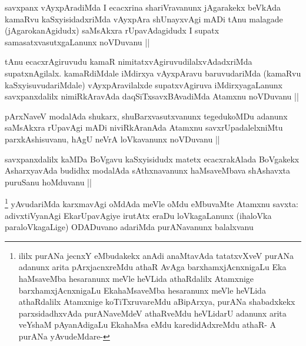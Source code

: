 \begin{artha}
savxpanx vAyxpAradiMda I ecacxrina shariVravanunx jAgarakekx beVkAda kamaRvu kaSxyisidadxriMda vAyxpAra shUnayxvAgi mADi tAnu malagade (jAgarokanAgidudx) saMsAkxra rUpavAdagidudx I supatx samasatxvasutxgaLanunx noVDuvanu ||
\end{artha}


\begin{artha}
tAnu ecacxrAgiruvudu kamaR nimitatxvAgiruvudilalxvAdadxriMda supatxnAgilalx. kamaRdiMdale iMdirxya vAyxpAravu baruvudariMda (kamaRvu kaSxyisuvudariMdale) vAyxpAravilalxde supatxvAgiruva iMdirxyagaLanunx savxpanxdalilx nimiRkAravAda daqSiTxsavxBAvadiMda Atamxnu noVDuvanu ||
\end{artha}


\begin{artha}
pArxNaveV modalAda shukarx, shuBarxvasutxvanunx tegedukoMDu adanunx saMsAkxra rUpavAgi mADi niviRkAranAda Atamxnu savxrUpadalelxniMtu parxkAshisuvanu, hAgU neVrA loVkavanunx noVDuvanu ||
\end{artha}


\begin{artha}
savxpanxdalilx kaMDa BoVgavu kaSxyisidudx matetx ecacxrakAlada BoVgakekx AsharxyavAda budidhx modalAda sAthxnavanunx haMsaveMbava shAshavxta puruSanu hoMduvanu ||
\end{artha}


\begin{artha}
\footnote{ililx purANa jecnxY eMbudakekx anAdi anaMtavAda tatatxvXveV purANa adanunx arita pArxjacnxreMdu athaR AvAga barxhamxjAcnxnigaLu Eka haMsaveMba hesaranunx meVle heVLida athaRdalilx Atamxnige barxhamxjAcnxnigaLu EkahaMsaveMba hesaranunx meVle heVLida athaRdalilx Atamxnige koTiTxruvareMdu aBipArxya, purANa shabadxkekx parxsidadhxvAda purANaveMdeV athaRveMdu heVLidarU adanunx arita veYshaM pAyanAdigaLu EkahaMsa eMdu karedidAdxreMdu athaR- A purANa yAvudeMdare- \stext}
yAvudariMda karxmavAgi oMdAda meVle oMdu eMbuvaMte Atamxnu savxta: adivxtiVyanAgi EkarUpavAgiye irutAtx eraDu loVkagaLanunx (ihaloVka paraloVkagaLige) ODADuvano adariMda purANavanunx balalxvanu
\end{artha}

